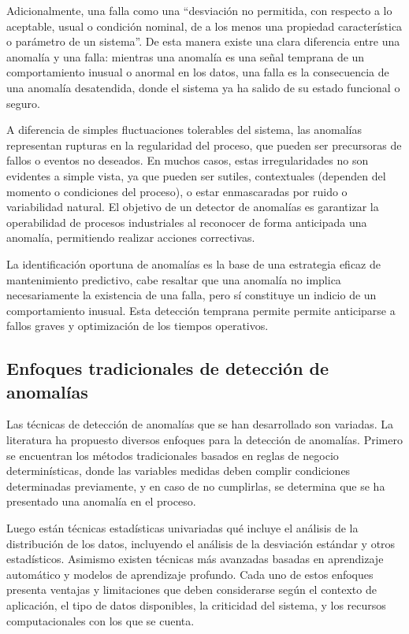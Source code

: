 \documentclass[11pt,a4paper,spanish]{book}
\numberwithin{equation}{chapter}
\numberwithin{figure}{chapter}
\begin{document}
Adicionalmente, \cite{leon2012anomalias} una falla como una “desviación no 
permitida, con respecto a lo aceptable, usual o condición nominal, de a los 
menos una propiedad característica o parámetro de un sistema”. De esta manera 
existe una clara diferencia entre una anomalía y una falla: mientras una anomalía 
es una señal temprana de un comportamiento inusual o anormal en los datos, una 
falla es la consecuencia de una anomalía desatendida, donde el sistema ya ha 
salido de su estado funcional o seguro. 


A diferencia de simples fluctuaciones tolerables del sistema, las anomalías 
representan rupturas en la regularidad del proceso, que pueden ser precursoras de 
fallos o eventos no deseados. En muchos casos, estas irregularidades no son evidentes 
a simple vista, ya que pueden ser sutiles, contextuales (dependen del momento o 
condiciones del proceso), o estar enmascaradas por ruido o variabilidad natural.
El objetivo de un detector de anomalías es garantizar la operabilidad de procesos 
industriales al reconocer de forma anticipada una anomalía, permitiendo realizar 
acciones correctivas. 


La identificación oportuna de anomalías es la base de una estrategia eficaz de 
mantenimiento predictivo, cabe resaltar que una anomalía no implica necesariamente
la existencia de una falla, pero sí constituye un indicio de un comportamiento inusual.
Esta detección temprana permite permite anticiparse a fallos graves y optimización de 
los tiempos operativos.

\subsection{Enfoques tradicionales de detección de anomalías}

Las técnicas de detección de anomalías que se han desarrollado son variadas. 
La literatura ha propuesto diversos enfoques para la detección de anomalías. 
Primero se encuentran los métodos tradicionales basados en reglas de negocio 
determinísticas, donde las variables medidas deben complir condiciones determinadas 
previamente, y en caso de no cumplirlas, se determina que se ha presentado una anomalía 
en el proceso. 


Luego están técnicas estadísticas univariadas qué incluye el análisis de la 
distribución de los datos, incluyendo el análisis de la desviación estándar y otros 
estadísticos. 
Asimismo existen técnicas más avanzadas basadas en aprendizaje automático y modelos de 
aprendizaje profundo. 
Cada uno de estos enfoques presenta ventajas y limitaciones que deben considerarse según 
el contexto de aplicación, el tipo de datos disponibles, la criticidad del sistema, y los 
recursos computacionales con los que se cuenta.
\end{document}
